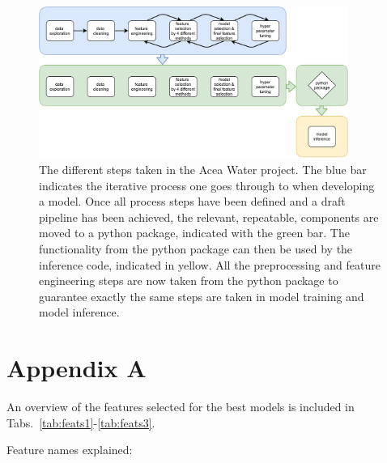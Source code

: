 \documentclass{article}
\begin{document}
\begin{figure}[htb]
\begin{center}
\includegraphics[width=0.9\textwidth]{figs/project_process.pdf}
\caption{The different steps taken in the Acea Water project. The blue bar indicates the iterative process one goes through to when developing a model. Once all process steps have been defined and a draft pipeline has been achieved, the relevant, repeatable, components are moved to a python package, indicated with the green bar. The functionality from the python package can then be used by the inference code, indicated in yellow. All the preprocessing and feature engineering steps are now taken from the python package to guarantee exactly the same steps are taken in model training and model inference.}
\label{fig:process}
\end{center}
\end{figure}


\FloatBarrier

\newpage

\section*{Appendix A}

An overview of the features selected for the best models is included in Tabs.~\ref{tab:feats1}-\ref{tab:feats3}.

Feature names explained:
\end{document}
